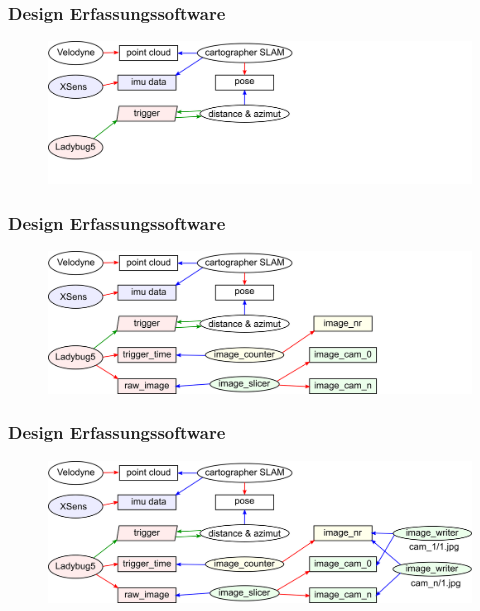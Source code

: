 \documentclass[aspectratio=169]{beamer}
\begin{document}
\begin{frame}
\frametitle{Design Erfassungssoftware}
     \begin{figure}[h]
       \centering
       \includegraphics[width=13.5cm]{./Abbildungen/ROSImageCapturing_2.png}
     \end{figure}
\end{frame}

\begin{frame}
\frametitle{Design Erfassungssoftware}
     \begin{figure}[h]
       \centering
       \includegraphics[width=13.5cm]{./Abbildungen/ROSImageCapturing_3.png}
     \end{figure}
\end{frame}

\begin{frame}
\frametitle{Design Erfassungssoftware}
     \begin{figure}[h]
       \centering
       \includegraphics[width=13.5cm]{./Abbildungen/ROSImageCapturing_4.png}
     \end{figure}
\end{frame}

\end{document}
